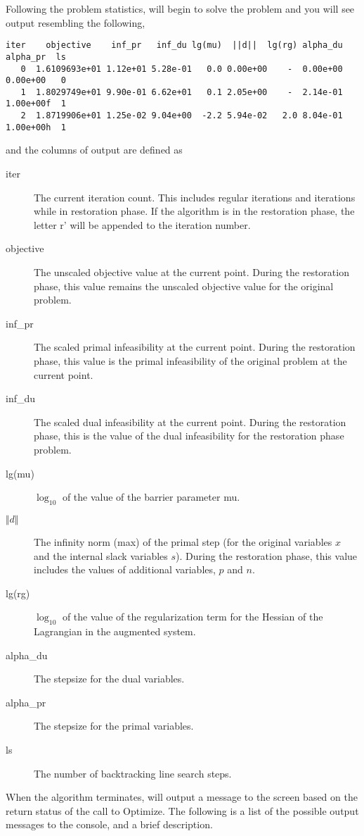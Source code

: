 Following the problem statistics, \IPOPT will begin to solve the problem and you will see output resembling the following,
\begin{verbatim}
iter    objective    inf_pr   inf_du lg(mu)  ||d||  lg(rg) alpha_du alpha_pr  ls
   0  1.6109693e+01 1.12e+01 5.28e-01   0.0 0.00e+00    -  0.00e+00 0.00e+00   0
   1  1.8029749e+01 9.90e-01 6.62e+01   0.1 2.05e+00    -  2.14e-01 1.00e+00f  1
   2  1.8719906e+01 1.25e-02 9.04e+00  -2.2 5.94e-02   2.0 8.04e-01 1.00e+00h  1
\end{verbatim}
and the columns of output are defined as
\begin{description}
\item[iter]
The current iteration count.
This includes regular iterations and iterations while in restoration phase.
If the algorithm is in the restoration phase, the letter r' will be appended to the iteration number.
\item[objective]
The unscaled objective value at the current point.
During the restoration phase, this value remains the unscaled objective value for the original problem.
\item[inf\_pr]
The scaled primal infeasibility at the current point.
During the restoration phase, this value is the primal infeasibility of the original problem at the current point.
\item[inf\_du]
The scaled dual infeasibility at the current point.
During the restoration phase, this is the value of the dual infeasibility for the restoration phase problem.
\item[lg(mu)]
$\log_{10}$ of the value of the barrier parameter mu.
\item[$\Vert d\Vert$]
The infinity norm (max) of the primal step (for the original variables $x$ and the internal slack variables $s$).
During the restoration phase, this value includes the values of additional variables, $p$ and $n$.
\item[lg(rg)]
$\log_{10}$ of the value of the regularization term for the Hessian of the Lagrangian in the augmented system.
\item[alpha\_du]
The stepsize for the dual variables.
\item[alpha\_pr]
The stepsize for the primal variables.
\item[ls]
The number of backtracking line search steps.
\end{description}

When the algorithm terminates, \IPOPT will output a message to the screen based on the return status of the call to Optimize.
The following is a list of the possible output messages to the console, and a brief description.

